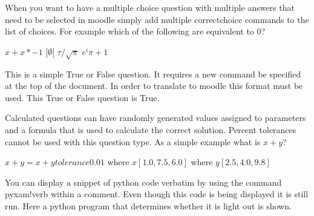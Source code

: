 \documentclass[12pt]{exam}
\newcommand{\tf}[1][]{%
        \fillin[#1][0.25in]%
    }
\begin{document}
\begin{questions}
                When you want to have a multiple choice question with multiple answers that need to be selected in moodle
                simply add multiple correctchoice commands to the list of choices. For example which of the following
                are equivalent to 0?
                \begin{choices}
                    \CorrectChoice $x + x*-1$
                    \CorrectChoice $|\emptyset|$
                    \choice $\tau / \sqrt{\pi}$
                    \CorrectChoice $e^i\pi + 1$
                \end{choices}

                \tf[T] This is a simple True or False question. It requires a new command be specified at the top of the
                document. In order to translate to moodle this format must be used. This True or False question is True.

                Calculated questions can have randomly generated values assigned to parameters and a formula that is used
                to calculate the correct solution. Percent tolerances cannot be used with this question type. As a simple
                example what is ${x} + {y}$?
                \begin{solution}
                    ${x} + {y} = {x} + {y} tolerance 0.01$
                    where ${x} [1.0, 7.5, 6.0]$
                    where ${y} [2.5, 4.0, 9.8]$
                \end{solution}

                You can display a snippet of python code verbatim by using the command pyxam!verb within a comment. Even
                though this code is being displayed it is still run. Here a python program that determines whether it is
                light out is shown.
                \begin{comment}
                    pyxam!verb

from time import localtime
# Is it dark outside?
dark = {
    1:16,2:17,3:18,4:19,5:19,6:20,7:20,8:19,9:18,10:17,11:16,12:16
}

light = {
    1:8,2:7,3:6,4:5,5:4,6:4,7:4,8:5,9:6,10:6,11:7,12:8
}
if localtime().tm_hour >=dark[localtime().tm_mon] or localtime().tm_hour < light[localtime().tm_mon]:
    answer = 'Yes'
else:
    answer = 'No'


\end{comment}
\end{questions}
\end{document}
